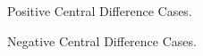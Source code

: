 \documentclass[12pt, a4paper, addpoints]{exam}
\begin{document}
\begin{questions}
\newpage

\question Positive Central Difference Cases.  
\setlength{\columnsep}{20pt}
\begin{multicols}{2}
\end{multicols}

\question Negative Central Difference Cases. 
\setlength{\columnsep}{20pt}
\begin{multicols}{2}
\end{multicols}
\end{questions}
\end{document}
